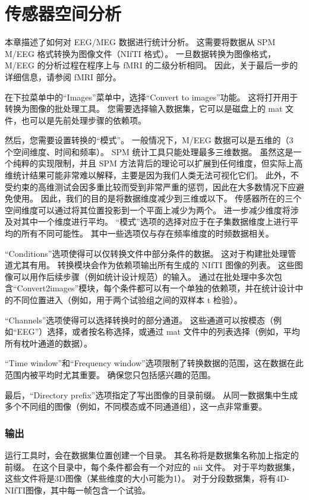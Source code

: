 \chapter{传感器空间分析}
\label{ch:13}


本章描述了如何对 EEG/MEG 数据进行统计分析。
这需要将数据从 SPM M/EEG 格式转换为图像文件（NIfTI 格式）。
一旦数据转换为图像格式，M/EEG 的分析过程在程序上与 fMRI 的二级分析相同。
因此，关于最后一步的详细信息，请参阅 fMRI 部分。

在下拉菜单中的“Images”菜单中，选择“Convert to images”功能。
这将打开用于转换为图像的批处理工具。
您需要选择输入数据集，它可以是磁盘上的 mat 文件，也可以是先前处理步骤的依赖项。

然后，您需要设置转换的“模式”。
一般情况下，M/EEG 数据可以是五维的（3 个空间维度、时间和频率）。
SPM 统计工具只能处理最多三维数据。
虽然这是一个纯粹的实现限制，并且 SPM 方法背后的理论可以扩展到任何维度，但实际上高维统计结果可能非常难以解释，主要是因为我们人类无法可视化它们。
此外，不受约束的高维测试会因多重比较而受到非常严重的惩罚，因此在大多数情况下应避免使用。
因此，我们的目的是将数据维度减少到三维或以下。
传感器所在的三个空间维度可以通过将其位置投影到一个平面上减少为两个。
进一步减少维度将涉及对其中一个维度进行平均。
“模式”选项的选择对应于在子集数据维度上进行平均的所有不同可能性。
其中一些选项仅与存在频率维度的时频数据相关。

“Conditions”选项使得可以仅转换文件中部分条件的数据。
这对于构建批处理管道尤其有用。
转换模块会作为依赖项输出所有生成的 NIfTI 图像的列表。
这些图像可以用作后续步骤（例如统计设计规范）的输入。
通过在批处理中多次包含“Convert2images”模块，每个条件都可以有一个单独的依赖项，并在统计设计中的不同位置进入（例如，用于两个试验组之间的双样本 t 检验）。

“Channels”选项使得可以选择转换时的部分通道。
这些通道可以按模态（例如“EEG”）选择，或者按名称选择，或通过 mat 文件中的列表选择（例如，平均所有枕叶通道的数据）。

“Time window”和“Frequency window”选项限制了转换数据的范围，这在数据在此范围内被平均时尤其重要。
确保您只包括感兴趣的范围。

最后，“Directory prefix”选项指定了写出图像的目录前缀。
从同一数据集中生成多个不同组的图像（例如，不同模态或不同通道组），这一点非常重要。


\subsection{输出}

运行工具时，会在数据集位置创建一个目录。
其名称将是数据集名称加上指定的前缀。
在这个目录中，每个条件都会有一个对应的 nii 文件。
对于平均数据集，这些文件将是3D图像（某些维度的大小可能为1）。
对于分段数据集，将有4D-NIfTI图像，其中每一帧包含一个试验。

